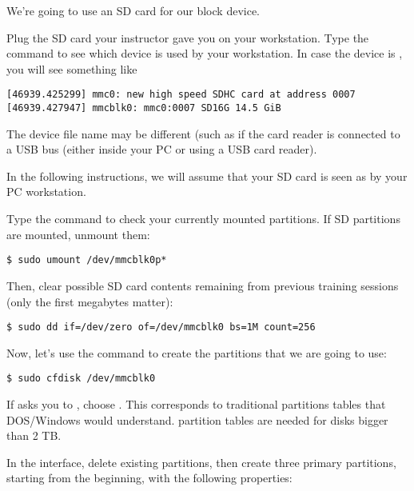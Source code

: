 We're going to use an SD card for our block device.

Plug the SD card your instructor gave you on your workstation. Type
the  command to see which device is used by your
workstation. In case the device is , you will see
something like

\begin{verbatim}
[46939.425299] mmc0: new high speed SDHC card at address 0007
[46939.427947] mmcblk0: mmc0:0007 SD16G 14.5 GiB
\end{verbatim}

The device file name may be different (such as 
if the card reader is connected to a USB bus (either inside your PC
or using a USB card reader).

In the following instructions, we will assume that your SD card
is seen as  by your PC workstation.

Type the  command to check your currently mounted
partitions. If SD partitions are mounted, unmount them:

\begin{verbatim}
$ sudo umount /dev/mmcblk0p*
\end{verbatim}

Then, clear possible SD card contents remaining from previous
training sessions (only the first megabytes matter):

\begin{verbatim}
$ sudo dd if=/dev/zero of=/dev/mmcblk0 bs=1M count=256
\end{verbatim}

Now, let's use the  command to create the partitions that
we are going to use:

\begin{verbatim}
$ sudo cfdisk /dev/mmcblk0
\end{verbatim}

If  asks you to , choose
. This corresponds to traditional partitions tables that DOS/Windows
would understand.  partition tables are needed for disks bigger
than 2 TB.

In the  interface, delete existing partitions, then
create three primary partitions, starting from the beginning, with the
following properties:

